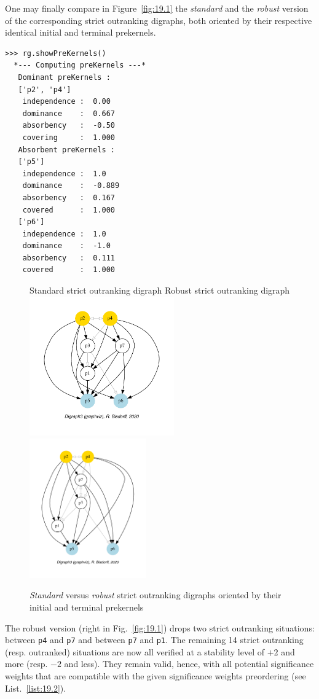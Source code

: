 One may finally compare in Figure~\vref{fig:19.1} the \emph{standard} and the \emph{robust} version of the corresponding strict outranking digraphs, both oriented by their respective identical initial and terminal prekernels.
\begin{lstlisting}
>>> rg.showPreKernels()
  *--- Computing preKernels ---*
   Dominant preKernels :
   ['p2', 'p4']
    independence :  0.00
    dominance    :  0.667
    absorbency   :  -0.50
    covering     :  1.000
   Absorbent preKernels :
   ['p5']
    independence :  1.0
    dominance    :  -0.889
    absorbency   :  0.167
    covered      :  1.000
   ['p6']
    independence :  1.0
    dominance    :  -1.0
    absorbency   :  0.111
    covered      :  1.000
\end{lstlisting}
\begin{figure}[ht]
  Standard strict outranking digraph \hfill Robust strict outranking digraph \\
  \includegraphics[height=6cm]{Figures/19-1-stdg.pdf}\hfill
  \includegraphics[height=6cm]{Figures/19-1-robg.pdf}
\caption{\emph{Standard} versus \emph{robust} strict outranking digraphs oriented by their initial and terminal prekernels} 
\label{fig:19.1}       %
\end{figure}
   
The robust version (right in Fig.~\vref{fig:19.1}) drops two strict outranking situations: between \texttt{p4} and \texttt{p7} and between \texttt{p7} and \texttt{p1}. The remaining 14 strict outranking (resp. outranked) situations are now all verified at a stability level of $+2$ and more (resp. $-2$ and less). They remain valid, hence, with all potential significance weights that are compatible with the given significance weights preordering (see List.~\vref{list:19.2}).

